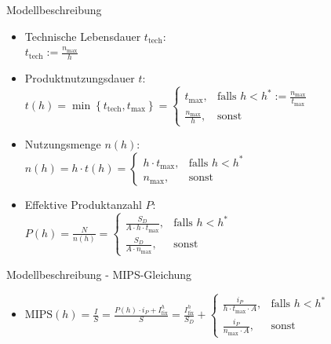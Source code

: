 \documentclass[beamer, xcolor={table,usenames,dvipsnames}]{beamer}
\begin{document}
	\begin{frame}{Modellbeschreibung}
		\begin{itemize}
			\item Technische Lebensdauer $t_\text{tech}$: \\ $t_\text{tech} := \frac{n_{\text{max}}}{h}$
			\pause
			\item Produktnutzungsdauer $t$: \\[5pt] $t(h) = \min \left\{t_\text{tech}, t_{\text{max}} \right\} = \left\{\begin{array}{cl}  t_{\text{max}}, & \mbox{falls } h < h^* := \frac{n_{\text{max}}}{t_{\text{max}}} \\ \frac{n_{\text{max}}}{h}, & \mbox{sonst} \end{array}\right.$
			\pause
			\item Nutzungsmenge $n(h)$: \\[5pt] $n (h) = h \cdot t(h) = \left\{\begin{array}{cl}  h \cdot t_{\text{max}}, & \mbox{falls } h < h^* \\ n_{\text{max}}, & \mbox{sonst} \end{array}\right.$
			\pause
			\item Effektive Produktanzahl $P$: \\[5pt] $P (h) = \frac{N}{n(h)} = \left\{\begin{array}{cl}  \frac{S_D}{A \cdot h \cdot t_{\text{max}}}, & \mbox{falls } h < h^* \\[5pt] \frac{S_D}{A \cdot n_{\text{max}}}, & \mbox{sonst} \end{array}\right.$
		\end{itemize}
	\end{frame}

	\begin{frame}{Modellbeschreibung - MIPS-Gleichung}
		\begin{itemize}
			\item $\text{MIPS}(h) = \frac{I}{S} = \frac{P(h) \cdot i_P + I_{\text{fix}}^h}{S} =
			\frac{I_{\text{fix}}^h}{S_D} + \left\{ \begin{array}{cl}  \frac{i_P}{h \cdot t_{\text{max}} \cdot A}, & \mbox{falls } h < h^* \\[5pt] \frac{i_P}{n_{\text{max}} \cdot A}, & \mbox{sonst} \end{array}\right.$
		\end{itemize}
		\pause
		\begin{center}
			\resizebox{0.7\linewidth}{!}{
				
			}
		\end{center}
	\end{frame}
\end{document}
